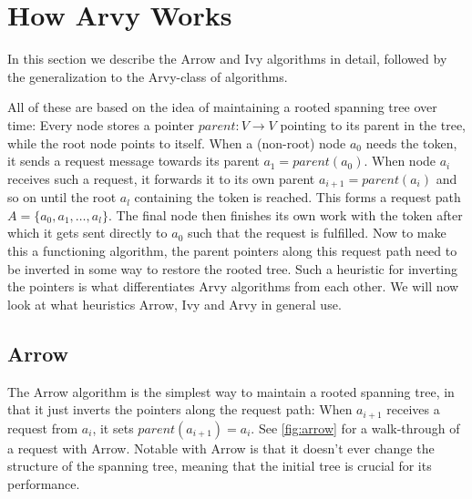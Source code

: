 \documentclass[a4paper, oneside]{discothesis}
\begin{document}
\section{How Arvy Works}

In this section we describe the Arrow and Ivy algorithms in detail, followed by the generalization to the Arvy-class of algorithms.

All of these are based on the idea of maintaining a rooted spanning tree over time: Every node stores a pointer $parent : V \rightarrow V$ pointing to its parent in the tree, while the root node points to itself. When a (non-root) node $a_{0}$ needs the token, it sends a request message towards its parent $a_{1}=parent(a_{0})$. When node $a_{i}$ receives such a request, it forwards it to its own parent $a_{i+1}=parent(a_{i})$ and so on until the root $a_{l}$ containing the token is reached. This forms a request path $A=\{a_{0},a_{1},\dots,a_{l}\}$. The final node then finishes its own work with the token after which it gets sent directly to $a_{0}$ such that the request is fulfilled. Now to make this a functioning algorithm, the parent pointers along this request path need to be inverted in some way to restore the rooted tree. Such a heuristic for inverting the pointers is what differentiates Arvy algorithms from each other. We will now look at what heuristics Arrow, Ivy and Arvy in general use.

\subsection{Arrow}
\label{intro:arrow}

The Arrow algorithm is the simplest way to maintain a rooted spanning tree, in that it just inverts the pointers along the request path: When $a_{i+1}$ receives a request from $a_{i}$, it sets $parent(a_{i+1})=a_{i}$. See \autoref{fig:arrow} for a walk-through of a request with Arrow. Notable with Arrow is that it doesn't ever change the structure of the spanning tree, meaning that the initial tree is crucial for its performance.
\end{document}
